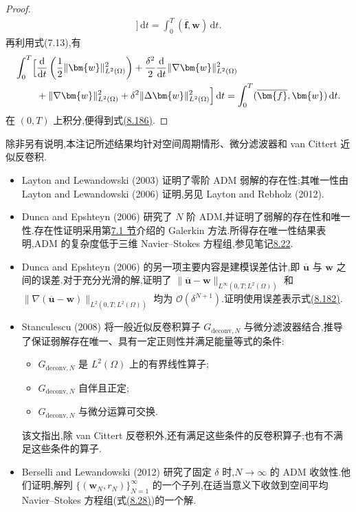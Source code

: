 \begin{proof}
\begin{equation}
\begin{aligned}
 \Bigr]\,\mathrm{d}t
 =\int_0^T(\overline{\bm{f}},\bm{w})\,\mathrm{d}t.
\end{aligned}
\end{equation}
再利用式(7.13),有
\[
\begin{aligned}
 \int_0^T\Bigl[
  &\frac{\mathrm{d}}{\mathrm{d}t}
   \left(\frac12\|\bm{w}\|_{L^2(\Omega)}^2\right)
   +\frac{\delta^2}{2}\frac{\mathrm{d}}{\mathrm{d}t}
    \|\nabla\bm{w}\|_{L^2(\Omega)}^2\\
  &+\|\nabla\bm{w}\|_{L^2(\Omega)}^2
   +\delta^2\|\Delta\bm{w}\|_{L^2(\Omega)}^2
 \Bigr]\,\mathrm{d}t
 =\int_0^T(\overline{\bm{f}},\bm{w})\,\mathrm{d}t.
\end{aligned}
\]
在 $(0,T)$ 上积分,便得到式\hyperref[eq:les-adm-zero-order-energy-equality]{(8.186)}.
\end{proof}

\begin{note}
\label{note:les-adm-analytical-results-survey}
除非另有说明,本注记所述结果均针对空间周期情形、微分滤波器和 van Cittert 近似反卷积.
\begin{itemize}
 \item Layton and Lewandowski (2003) 证明了零阶 ADM 弱解的存在性;其唯一性由 Layton and Lewandowski (2006) 证明,另见 Layton and Rebholz (2012).
 \item Dunca and Epshteyn (2006) 研究了 $N$ 阶 ADM,并证明了弱解的存在性和唯一性.存在性证明采用第\hyperref[sec:time-dependent-ns-continuous]{7.1 节}介绍的 Galerkin 方法.所得存在唯一性结果表明,ADM 的复杂度低于三维 Navier--Stokes 方程组,参见笔记\hyperref[note:three-dimensional-navier-stokes-extensions]{8.22}.
 \item Dunca and Epshteyn (2006) 的另一项主要内容是建模误差估计,即 $\overline{\bm{u}}$ 与 $\bm{w}$ 之间的误差.对于充分光滑的解,证明了
 $\|\overline{\bm{u}}-\bm{w}\|_{L^\infty(0,T;L^2(\Omega))}$ 和
 $\|\nabla(\overline{\bm{u}}-\bm{w})\|_{L^2(0,T;L^2(\Omega))}$
 均为 $\mathcal{O}(\delta^{N+1})$.证明使用误差表示式\hyperref[eq:les-adm-error-representation]{(8.182)}.
 \item Stanculescu (2008) 将一般近似反卷积算子 $G_{\mathrm{deconv},N}$ 与微分滤波器结合,推导了保证弱解存在唯一、具有一定正则性并满足能量等式的条件:
 \begin{itemize}
  \item $G_{\mathrm{deconv},N}$ 是 $L^2(\Omega)$ 上的有界线性算子;
  \item $G_{\mathrm{deconv},N}$ 自伴且正定;
  \item $G_{\mathrm{deconv},N}$ 与微分运算可交换.
 \end{itemize}
 该文指出,除 van Cittert 反卷积外,还有满足这些条件的反卷积算子;也有不满足这些条件的算子.
 \item Berselli and Lewandowski (2012) 研究了固定 $\delta$ 时,$N\to\infty$ 的 ADM 收敛性.他们证明,解列
 $\{(\bm{w}_N,r_N)\}_{N=1}^\infty$ 的一个子列,在适当意义下收敛到空间平均 Navier--Stokes 方程组(式\hyperref[eq:space-averaged-navier-stokes-full-space]{(8.28)})的一个解.
\end{itemize}
\end{note}

